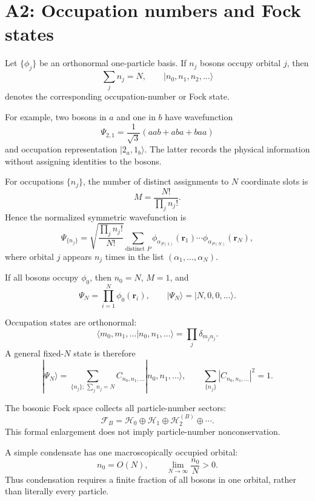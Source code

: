 \section{A2: Occupation numbers and Fock states}

Let $\{\phi_j\}$ be an orthonormal one-particle basis. If $n_j$ bosons occupy
orbital $j$, then
\[
\sum_j n_j=N,
\qquad
\boxed{|n_0,n_1,n_2,\ldots\rangle}
\]
denotes the corresponding occupation-number or Fock state.

For example, two bosons in $a$ and one in $b$ have wavefunction
\[
\Psi_{2,1}
=\frac1{\sqrt3}(aab+aba+baa)
\]
and occupation representation $|2_a,1_b\rangle$. The latter records the
physical information without assigning identities to the bosons.

For occupations $\{n_j\}$, the number of distinct assignments to $N$
coordinate slots is
\[
M=\frac{N!}{\prod_j n_j!}.
\]
Hence the normalized symmetric wavefunction is
\[
\boxed{
\Psi_{\{n_j\}}
=
\sqrt{\frac{\prod_jn_j!}{N!}}
\sum_{\text{distinct }P}
\phi_{\alpha_{P(1)}}(\mathbf r_1)\cdots
\phi_{\alpha_{P(N)}}(\mathbf r_N),
}
\]
where orbital $j$ appears $n_j$ times in the list
$(\alpha_1,\ldots,\alpha_N)$.

If all bosons occupy $\phi_0$, then $n_0=N$, $M=1$, and
\[
\Psi_N=\prod_{i=1}^N\phi_0(\mathbf r_i),
\qquad
|\Psi_N\rangle=|N,0,0,\ldots\rangle.
\]

Occupation states are orthonormal:
\[
\langle m_0,m_1,\ldots|n_0,n_1,\ldots\rangle
=\prod_j\delta_{m_jn_j}.
\]
A general fixed-$N$ state is therefore
\[
|\Psi_N\rangle
=\sum_{\{n_j\};\,\sum_jn_j=N}
C_{n_0,n_1,\ldots}|n_0,n_1,\ldots\rangle,
\qquad
\sum_{\{n_j\}}|C_{n_0,n_1,\ldots}|^2=1.
\]

The bosonic Fock space collects all particle-number sectors:
\[
\mathcal F_B
=\mathcal H_0\oplus\mathcal H_1\oplus
\mathcal H_2^{(B)}\oplus\cdots.
\]
This formal enlargement does not imply particle-number nonconservation.

A simple condensate has one macroscopically occupied orbital:
\[
n_0=O(N),
\qquad
\lim_{N\to\infty}\frac{n_0}{N}>0.
\]
Thus condensation requires a finite fraction of all bosons in one orbital,
rather than literally every particle.
